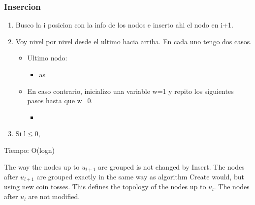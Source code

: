 \documentclass[10pt]{beamer}
\begin{document}

\begin{frame}
\frametitle{Insercion}
  \begin{enumerate}
    \item  Busco la i posicion con la info de los nodos e inserto
  ahi el nodo en i+1.
  \item Voy nivel por nivel desde el ultimo hacia arriba.
  En cada uno tengo dos casos.
  \begin{itemize}
    \item Ultimo nodo:
      \begin{itemize}
        \item as
      \end{itemize}
    \item En caso contrario, inicializo una variable w=1 y repito los siguientes pasos hasta que w=0.
      \begin{itemize}
        \item
      \end{itemize}
  \end{itemize}
\item Si l$\leq$0,
\end{enumerate}
  Tiempo: O(logn)

  The way the nodes up to $u_{l+1}$ are grouped is not changed by Insert.
  The nodes after $u_{l+1}$ are grouped exactly in the same way as algorithm Create would,
  but using new coin tosses.
  This defines the topology of the nodes up to $u_l$.
  The nodes after $u_l$ are not modified.

\end{frame}

\end{document}
